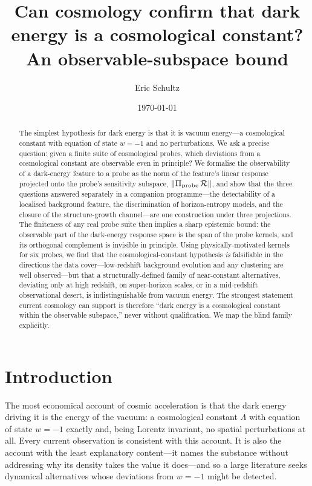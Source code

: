 \documentclass[twocolumn,10pt]{article}
\title{\vspace{-2em}\textbf{Can cosmology confirm that dark energy is a cosmological constant?
An observable-subspace bound}}
\author[]{Eric Schultz}
\affil[]{Independent researcher \quad ORCID: 0009-0006-6283-1696}
\date{\today}
\begin{document}
\maketitle

\begin{abstract}
\noindent
The simplest hypothesis for dark energy is that it is vacuum energy---a
cosmological constant with equation of state $w=-1$ and no perturbations. We ask
a precise question: given a finite suite of cosmological probes, which
deviations from a cosmological constant are observable even in principle? We
formalise the observability of a dark-energy feature to a probe as the norm of
the feature's linear response projected onto the probe's sensitivity subspace,
$\|\Pi_{\rm probe}\,\mathcal{R}\|$, and show that the three questions answered
separately in a companion programme---the detectability of a localised
background feature, the discrimination of horizon-entropy models, and the
closure of the structure-growth channel---are one construction under three
projections. The finiteness of any real probe suite then implies a sharp
epistemic bound: the observable part of the dark-energy response space is the
span of the probe kernels, and its orthogonal complement is invisible in
principle. Using physically-motivated kernels for six probes, we find that the
cosmological-constant hypothesis \emph{is} falsifiable in the directions the
data cover---low-redshift background evolution and any clustering are well
observed---but that a structurally-defined family of near-constant
alternatives, deviating only at high redshift, on super-horizon scales, or in a
mid-redshift observational desert, is indistinguishable from vacuum energy. The
strongest statement current cosmology can support is therefore ``dark energy is
a cosmological constant within the observable subspace,'' never without
qualification. We map the blind family explicitly.
\end{abstract}

\section{Introduction}
\label{sec:intro}

The most economical account of cosmic acceleration is that the dark energy
driving it is the energy of the vacuum: a cosmological constant $\Lambda$ with
equation of state $w=-1$ exactly and, being Lorentz invariant, no spatial
perturbations at all. Every current observation is consistent with this
account. It is also the account with the least explanatory content---it names
the substance without addressing why its density takes the value it does---and
so a large literature seeks dynamical alternatives whose deviations from
$w=-1$ might be detected.
\end{document}
